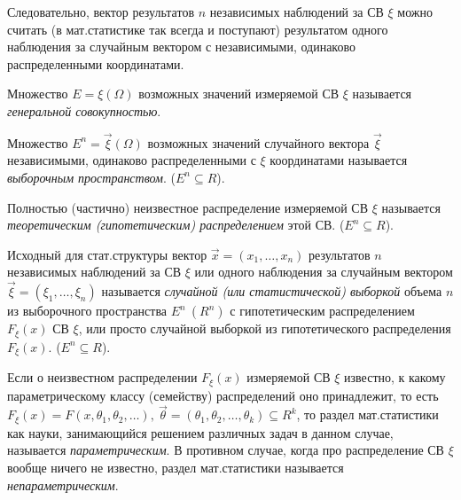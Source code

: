 Следовательно, вектор результатов $n$ независимых наблюдений за СВ $\xi$ можно считать (в мат.статистике так всегда и поступают)
результатом одного наблюдения за случайным вектором с независимыми, одинаково распределенными координатами.

\begin{defs}
  Множество $E=\xi(\Omega)$ возможных значений измеряемой СВ $\xi$ называется \textit{генеральной совокупностью}.
\end{defs}

\begin{defs}
  Множество $E^n=\overrightarrow{\xi}(\Omega)$ возможных значений случайного вектора $\overrightarrow{\xi}$
  независимыми, одинаково распределенными с $\xi$ координатами называется \textit{выборочным пространством}.
  ($E^n \subseteq R$).
\end{defs}

\begin{defs}
  Полностью (частично) неизвестное распределение измеряемой СВ $\xi$ называется \textit{теоретическим (гипотетическим) распределением} этой СВ.
  ($E^n \subseteq R$).
\end{defs}

\begin{defs}
  Исходный для стат.структуры вектор $\overrightarrow{x} = (x_1,\ldots,x_n)$ результатов $n$ независимых наблюдений
  за СВ $\xi$ или одного наблюдения за случайным вектором $\overrightarrow{\xi} = (\xi_1,\ldots,\xi_n)$ называется
  \textit{случайной (или статистической) выборкой} объема $n$ из выборочного пространства $E^n \ (R^n)$ с гипотетическим
  распределением $F_{\xi}(x)$ СВ $\xi$, или просто случайной выборкой из гипотетического распределения $F_{\xi}(x)$.
  ($E^n \subseteq R$).
\end{defs}

\begin{defs}
  Если о неизвестном распределении $F_{\xi}(x)$ измеряемой СВ $\xi$ известно, к какому параметрическому классу
  (семейству) распределений оно принадлежит, то есть $F_{\xi}(x)=F(x,\theta_1,\theta_2,\ldots), \
  \overrightarrow{\theta}=(\theta_1, \theta_2,\ldots,\theta_k) \subseteq R^k$, то раздел мат.статистики как науки,
  занимающийся решением различных задач в данном случае, называется \textit{параметрическим}. В противном случае, когда про
  распределение СВ $\xi$ вообще ничего не известно, раздел мат.статистики называется \textit{непараметрическим}.
\end{defs}


